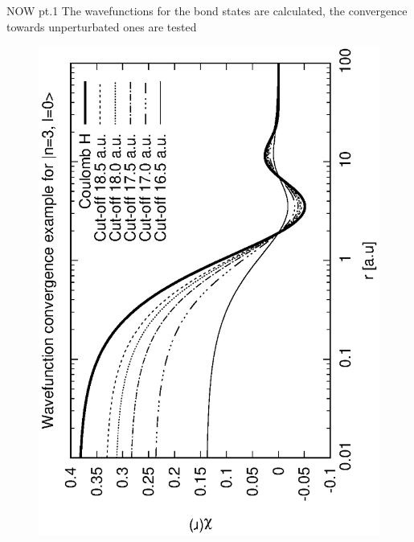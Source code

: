 \documentclass{beamer}
\begin{document}
\begin{frame}{NOW pt.1}
    The wavefunctions for the bond states are calculated, the convergence towards unperturbated ones are tested
    
    \begin{figure}
        \includegraphics[scale=0.32,angle=-90]{fig/psi_n_3_l_0.eps}
    \hfill    

\end{figure}
\end{frame}
\end{document}
